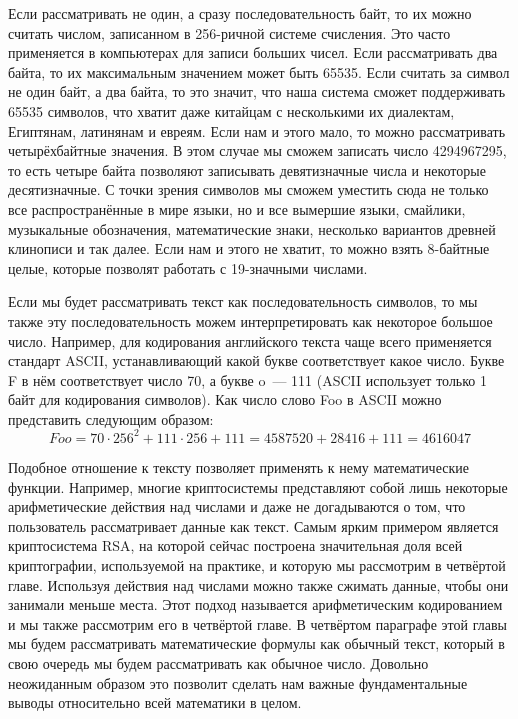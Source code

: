 Если рассматривать не один, а сразу последовательность байт, то их можно считать числом, записанном в 256-ричной системе счисления. Это часто применяется в компьютерах для записи больших чисел. Если рассматривать два байта, то их максимальным значением может быть 65535. Если считать за символ не один байт, а два байта, то это значит, что наша система сможет поддерживать 65535 символов, что хватит даже китайцам с несколькими их диалектам, Египтянам, латинянам и евреям. Если нам и этого мало, то можно рассматривать четырёхбайтные значения. В этом случае мы сможем записать число 4294967295, то есть четыре байта позволяют записывать девятизначные числа и некоторые десятизначные. С точки зрения символов мы сможем уместить сюда не только все распространённые в мире языки, но и все вымершие языки, смайлики, музыкальные обозначения, математические знаки, несколько вариантов древней клинописи и так далее. Если нам и этого не хватит, то можно взять 8-байтные целые, которые позволят работать с 19-значными числами.

Если мы будет рассматривать текст как последовательность символов, то мы также эту последовательность можем интерпретировать как некоторое большое число. Например, для кодирования английского текста чаще всего применяется стандарт ASCII, устанавливающий какой букве соответствует какое число. Букве F в нём соответствует число 70, а букве o~--- 111 (ASCII использует только 1 байт для кодирования символов). Как число слово Foo в ASCII можно представить следующим образом:
$$Foo = 70 \cdot 256^2 + 111 \cdot 256 + 111 = 4587520 + 28416 + 111 = 4616047$$

Подобное отношение к тексту позволяет применять к нему математические функции. Например, многие криптосистемы представляют собой лишь некоторые арифметические действия над числами и даже не догадываются о том, что пользователь рассматривает данные как текст. Самым ярким примером является криптосистема RSA, на которой сейчас построена значительная доля всей криптографии, используемой на практике, и которую мы рассмотрим в четвёртой главе. Используя действия над числами можно также сжимать данные, чтобы они занимали меньше места. Этот подход называется арифметическим кодированием и мы также рассмотрим его в четвёртой главе. В четвёртом параграфе этой главы мы будем рассматривать математические формулы как обычный текст, который в свою очередь мы будем рассматривать как обычное число. Довольно неожиданным образом это позволит сделать нам важные фундаментальные выводы относительно всей математики в целом.

